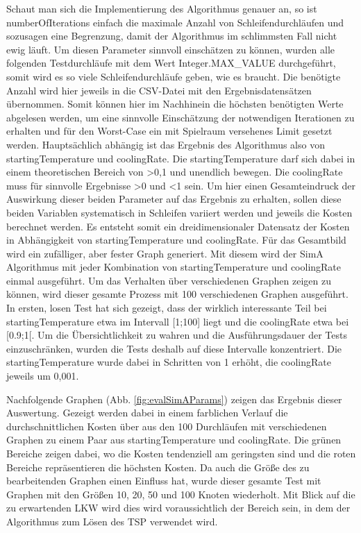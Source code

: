 Schaut man sich die Implementierung des Algorithmus genauer an, so ist numberOfIterations einfach die maximale Anzahl von Schleifendurchläufen und sozusagen eine Begrenzung, damit der Algorithmus im schlimmsten Fall nicht ewig läuft. Um diesen Parameter sinnvoll einschätzen zu können, wurden alle folgenden Testdurchläufe mit dem Wert Integer.MAX\_VALUE durchgeführt, somit wird es so viele Schleifendurchläufe geben, wie es braucht. Die benötigte Anzahl wird hier jeweils in die CSV-Datei mit den Ergebnisdatensätzen übernommen. Somit können hier im Nachhinein die höchsten benötigten Werte abgelesen werden, um eine sinnvolle Einschätzung der notwendigen Iterationen zu erhalten und für den Worst-Case ein mit Spielraum versehenes Limit gesetzt werden. Hauptsächlich abhängig ist das Ergebnis des Algorithmus also von startingTemperature und coolingRate. Die startingTemperature darf sich dabei in einem theoretischen Bereich von >0,1 und unendlich bewegen. Die coolingRate muss für sinnvolle Ergebnisse >0 und <1 sein. Um hier einen Gesamteindruck der Auswirkung dieser beiden Parameter auf das Ergebnis zu erhalten, sollen diese beiden Variablen systematisch in Schleifen variiert werden und jeweils die Kosten berechnet werden. Es entsteht somit ein dreidimensionaler Datensatz der Kosten in Abhängigkeit von startingTemperature und coolingRate. Für das Gesamtbild wird ein zufälliger, aber fester Graph generiert. Mit diesem wird der SimA Algorithmus mit jeder Kombination von startingTemperature und coolingRate einmal ausgeführt. Um das Verhalten über verschiedenen Graphen zeigen zu können, wird dieser gesamte Prozess mit 100 verschiedenen Graphen ausgeführt. In ersten, losen Test hat sich gezeigt, dass der wirklich interessante Teil bei startingTemperature etwa im Intervall [1;100] liegt und die coolingRate etwa bei [0.9;1[. Um die Übersichtlichkeit zu wahren und die Ausführungsdauer der Tests einzuschränken, wurden die Tests deshalb auf diese Intervalle konzentriert. Die startingTemperature wurde dabei in Schritten von 1 erhöht, die coolingRate jeweils um 0,001.

Nachfolgende Graphen (Abb. \ref{fig:evalSimAParams}) zeigen das Ergebnis dieser Auswertung. Gezeigt werden dabei in einem farblichen Verlauf die durchschnittlichen Kosten über aus den 100 Durchläufen mit verschiedenen Graphen zu einem Paar aus startingTemperature und coolingRate. Die grünen Bereiche zeigen dabei, wo die Kosten tendenziell am geringsten sind und die roten Bereiche repräsentieren die höchsten Kosten. Da auch die Größe des zu bearbeitenden Graphen einen Einfluss hat, wurde dieser gesamte Test mit Graphen mit den Größen 10, 20, 50 und 100 Knoten wiederholt. Mit Blick auf die zu erwartenden LKW  wird dies wird voraussichtlich der Bereich sein, in dem der Algorithmus zum Lösen des TSP verwendet wird.

